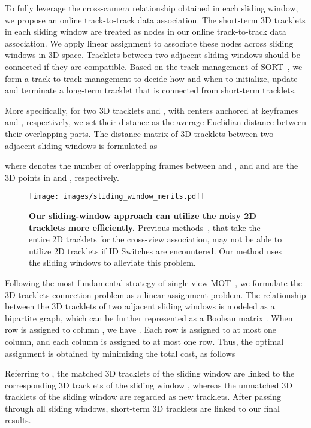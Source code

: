 \documentclass{CVM}
\begin{document}
To fully leverage the cross-camera relationship obtained in each sliding window, we propose an online track-to-track data association. The short-term 3D tracklets in each sliding window are treated as nodes in our online track-to-track data association. We apply linear assignment to associate these nodes across sliding windows in 3D space. Tracklets between two adjacent sliding windows should be connected if they are compatible. Based on the track management of SORT~\cite{Bewley2016_sort}, we form a track-to-track management to decide how and when to initialize, update and terminate a long-term tracklet that is connected from short-term tracklets.






More specifically, for two 3D tracklets  and , with centers anchored at keyframes  and , respectively, we set their distance as the average Euclidian distance between their overlapping parts. The distance matrix of 3D tracklets between two adjacent sliding windows is formulated as
  
  where  denotes the number of overlapping frames between  and , and  and  are the 3D points in  and , respectively.

  \begin{figure}[!h]
    \centering
    \texttt{[image: images/sliding\_window\_merits.pdf]}
    \caption{\textbf{Our sliding-window approach can utilize the noisy 2D tracklets more efficiently.} Previous methods~\cite{sternig2011multi,wen2017multi,kohl2020mta, he2020multi}, that take the entire 2D tracklets for the cross-view association, may not be able to utilize 2D tracklets if ID Switches are encountered. Our method uses the sliding windows to alleviate this problem.
    }\label{fig:sw_metrit}
  \end{figure}

  Following the most fundamental strategy of single-view MOT~\cite{Bewley2016_sort, Wojke2017simple}, we formulate the 3D tracklets connection problem as a linear assignment problem. The relationship between the 3D tracklets of two adjacent sliding windows is modeled as a bipartite graph, which can be further represented as a Boolean matrix . When row  is assigned to column , we have . Each row is assigned to at most one column, and each column is assigned to at most one row. Thus, the optimal assignment  is obtained by minimizing the total cost, as follows
  
  
  Referring to , the matched 3D tracklets of the sliding window  are linked to the corresponding 3D tracklets of the sliding window , whereas the unmatched 3D tracklets of the sliding window  are regarded as new tracklets. After passing through all sliding windows, short-term 3D tracklets are linked to our final results.
\end{document}
